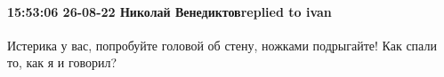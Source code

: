  
 
 
 
 

\paragraph{15:53:06 26-08-22 Николай Венедиктовreplied to ivan}

Истерика у вас, попробуйте головой об стену, ножками подрыгайте! Как спали то,
как я и говорил?
